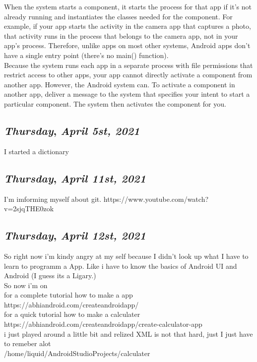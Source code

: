 When the system starts a component, it starts the process for that app if it's not already running and instantiates the classes needed for the component. 
For example, if your app starts the activity in the camera app that captures a photo, that activity runs in the process that belongs to the camera app, not in your app's process. 
Therefore, unlike apps on most other systems, Android apps don't have a single entry point (there's no main() function).\\

Because the system runs each app in a separate process with file permissions that restrict access to other apps, your app cannot directly activate a component from another app. 
However, the Android system can. To activate a component in another app, deliver a message to the system that specifies your intent to start a particular component. 
The system then activates the component for you.


\def\day{\textit{April 5st, 2021}}
\def\weekday{\textit{Thursday}}
\subsection*{\weekday, \day}

I started a dictionary


\def\day{\textit{April 11st, 2021}}
\def\weekday{\textit{Thursday}}
\subsection*{\weekday, \day}

I'm imforming myself about git.
https://www.youtube.com/watch?v=2sjqTHE0zok

\newpage

\def\day{\textit{April 12st, 2021}}
\def\weekday{\textit{Thursday}}
\subsection*{\weekday, \day}


So right now i'm kindy angry at my self because I didn't look up what I have to learn to programm a App. Like i have to know the basics of Android UI and Android (I guess its a Ligary.)\\
So now i'm on \\
for a complete tutorial how to make a app\\
https://abhiandroid.com/createandroidapp/ \\

for a quick tutorial how to make a calculater\\
https://abhiandroid.com/createandroidapp/create-calculator-app \\
i just played around a little bit and relized XML is not that hard, just I just have to remeber alot \\
/home/liquid/AndroidStudioProjects/calculater\\\\

